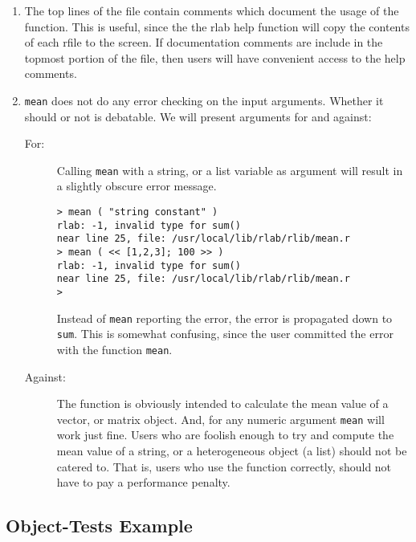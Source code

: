    \begin{enumerate}
      \item The top lines of the file contain comments which document
            the usage of the function. This is useful, since the the
            rlab help function will copy the contents of each rfile to
            the screen. If documentation comments are include in the
            topmost portion of the file, then users will have
            convenient access to the help comments.

      \item \verb+mean+ does not do any error checking on the input
            arguments. Whether it should or not is debatable. We will
            present arguments for and against:

         \begin{description}
            \item[For:] Calling \verb+mean+ with a string, or a list
            variable as argument will result in a slightly obscure
            error message.

            \begin{verbatim}
> mean ( "string constant" )
rlab: -1, invalid type for sum()
near line 25, file: /usr/local/lib/rlab/rlib/mean.r
> mean ( << [1,2,3]; 100 >> )
rlab: -1, invalid type for sum()
near line 25, file: /usr/local/lib/rlab/rlib/mean.r
>             \end{verbatim}

            Instead of \verb+mean+ reporting the error, the error is
            propagated down to \verb+sum+. This is somewhat confusing,
            since the user committed the error with the function
            \verb+mean+. 

            \item[Against:] The function is obviously intended to
            calculate the mean value of a vector, or matrix object.
            And, for any numeric argument \verb+mean+ will work just
            fine. Users who are foolish enough to try and compute the
            mean value of a string, or a heterogeneous object (a list)
            should not be catered to. That is, users who use the
            function correctly, should not have to pay a performance
            penalty.
         \end{description}
   \end{enumerate}
   
\subsection{Object-Tests Example}

